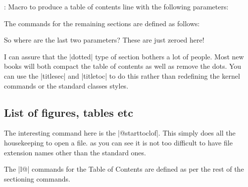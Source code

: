\begin{teX}
: Macro
to produce a table of contents line with the following parameters:
\end{teX}

The commands for the remaining sections are defined as follows:

\begin{teX}
\newcommand*\l@section{\@dottedtocline{1}{1.5em}{2.3em}}
\newcommand*\l@subsection{\@dottedtocline{2}{3.8em}{3.2em}}
\newcommand*\l@subsubsection{\@dottedtocline{3}{7.0em}{4.1em}}
\newcommand*\l@paragraph{\@dottedtocline{4}{10em}{5em}}
\newcommand*\l@subparagraph{\@dottedtocline{5}{12em}{6em}}
\end{teX}

So where are the last two parameters? These are just zeroed here!


I can assure that the |dotted| type of section bothers a lot of people. Most new books will both compact the table of contents as well as remove the dots. You can use the |titlesec| and |titletoc| to do this rather than redefining the kernel commands or the standard classes styles.

\subsection*{List of figures, tables etc}
\begin{teX}
\newcommand\listoffigures{%
    \if@twocolumn
      \@restonecoltrue\onecolumn
    \else
      \@restonecolfalse
    \fi
    \chapter*{\listfigurename}%
      \@mkboth{\MakeUppercase\listfigurename}%
              {\MakeUppercase\listfigurename}%
    \@starttoc{lof}%
    \if@restonecol\twocolumn\fi
    }
\end{teX}
The interesting command here is the |@starttoc{lof}|. This simply does all the housekeeping to open a file. as you can see it is not too difficult to have file extension names other than the standard ones.

The |l@| commands for the Table of Contents are defined as per the rest of the sectioning commands.

\begin{teX}
\newcommand*\l@figure{\@dottedtocline{1}{1.5em}{2.3em}}
\newcommand\listoftables{%
    \if@twocolumn
      \@restonecoltrue\onecolumn
    \else
      \@restonecolfalse
    \fi
    \chapter*{\listtablename}%
      \@mkboth{%
          \MakeUppercase\listtablename}%
         {\MakeUppercase\listtablename}%
    \@starttoc{lot}%
    \if@restonecol\twocolumn\fi
    }
\let\l@table\l@figure
\end{teX}

